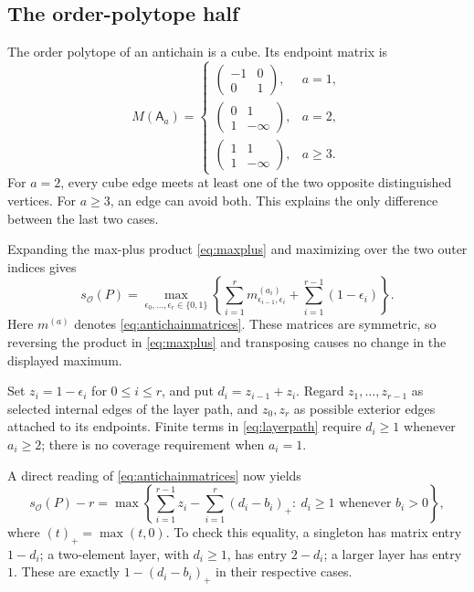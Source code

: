\documentclass[11pt]{article}
\theoremstyle{definition}
\newcommand{\OO}{\mathcal O}
\newcommand{\sO}{s_{\OO}}
\newcommand{\A}[1]{\mathsf A_{#1}}
\newcommand{\smat}[4]{\left(\begin{smallmatrix}#1&#2\\#3&#4\end{smallmatrix}\right)}
\begin{document}
\subsection{The order-polytope half}
The order polytope of an antichain is a cube. Its endpoint matrix is
\begin{equation}\label{eq:antichainmatrices}
M(\A a)=
\begin{cases}
\smat{-1}{0}{0}{1},&a=1,\\[2pt]
\smat{0}{1}{1}{-\infty},&a=2,\\[2pt]
\smat{1}{1}{1}{-\infty},&a\ge3.
\end{cases}
\end{equation}
For $a=2$, every cube edge meets at least one of the two opposite distinguished vertices. For $a\ge3$, an edge can avoid both. This explains the only difference between the last two cases.

Expanding the max-plus product \eqref{eq:maxplus} and maximizing over the two outer indices gives
\begin{equation}\label{eq:layerpath}
\sO(P)=\max_{\epsilon_0,\ldots,\epsilon_r\in\{0,1\}}
\left\{\sum_{i=1}^r m^{(a_i)}_{\epsilon_{i-1},\epsilon_i}
       +\sum_{i=1}^{r-1}(1-\epsilon_i)\right\}.
\end{equation}
Here $m^{(a)}$ denotes \eqref{eq:antichainmatrices}. These matrices are symmetric, so reversing the product in \eqref{eq:maxplus} and transposing causes no change in the displayed maximum.

Set $z_i=1-\epsilon_i$ for $0\le i\le r$, and put $d_i=z_{i-1}+z_i$. Regard $z_1,\ldots,z_{r-1}$ as selected internal edges of the layer path, and $z_0,z_r$ as possible exterior edges attached to its endpoints. Finite terms in \eqref{eq:layerpath} require $d_i\ge1$ whenever $a_i\ge2$; there is no coverage requirement when $a_i=1$.

A direct reading of \eqref{eq:antichainmatrices} now yields
\begin{equation}\label{eq:penalty}
\sO(P)-r=
\max\left\{
\sum_{i=1}^{r-1}z_i-\sum_{i=1}^r(d_i-b_i)_+
:\ d_i\ge1\text{ whenever }b_i>0
\right\},
\end{equation}
where $(t)_+=\max(t,0)$. To check this equality, a singleton has matrix entry $1-d_i$; a two-element layer, with $d_i\ge1$, has entry $2-d_i$; a larger layer has entry $1$. These are exactly $1-(d_i-b_i)_+$ in their respective cases.
\end{document}

